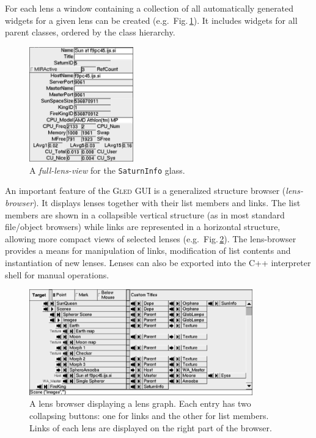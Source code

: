 \documentclass[final]{siamltex}
\def\gled{\textsc{Gled}\xspace}
\def\foottt#1{{\footnotesize\texttt{#1}}}
\begin{document}
For each lens a window containing a collection of all automatically
generated widgets for a given lens can be created (e.g.\ 
Fig.\,\ref{fig:full_view}). It includes widgets for all parent
classes, ordered by the class hierarchy.

\begin{figure}
  \centering
  \includegraphics[width=4.5cm]{figs/full_view}
  \caption{A \emph{full-lens-view} for the \foottt{SaturnInfo} glass.}
  \label{fig:full_view}
\end{figure}

An important feature of the \gled GUI is a generalized structure
browser (\emph{lens-browser}). It displays lenses together with their
list members and links. The list members are shown in a collapsible
vertical structure (as in most standard file/object browsers) while
links are represented in a horizontal structure, allowing more compact
views of selected lenses (e.g.\ Fig.\,\ref{fig:link_view}). The
lens-browser provides a means for manipulation of links, modification
of list contents and instantiation of new lenses. Lenses can also be
exported into the C++ interpreter shell for manual operations.

\begin{figure}
  \centering
  \includegraphics[width=0.86\textwidth]{figs/link_view}
  \caption{A lens browser displaying a lens graph. Each entry has two
    collapsing buttons: one for links and the other for list members.
    Links of each lens are displayed on the right part of the
    browser.}
  \label{fig:link_view}
\end{figure}
\end{document}
